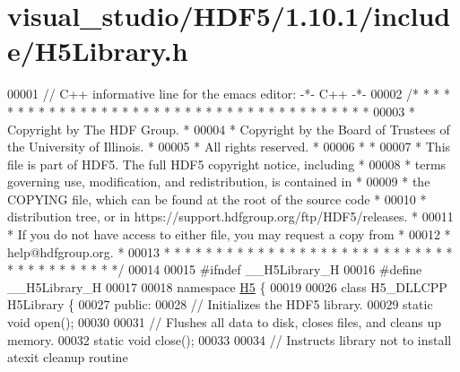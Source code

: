 \hypertarget{visual__studio_2_h_d_f5_21_810_81_2include_2_h5_library_8h_source}{}\section{visual\+\_\+studio/\+H\+D\+F5/1.10.1/include/\+H5\+Library.h}
\label{visual__studio_2_h_d_f5_21_810_81_2include_2_h5_library_8h_source}

\begin{DoxyCode}
00001 \textcolor{comment}{// C++ informative line for the emacs editor: -*- C++ -*-}
00002 \textcolor{comment}{/* * * * * * * * * * * * * * * * * * * * * * * * * * * * * * * * * * * * * * *}
00003 \textcolor{comment}{ * Copyright by The HDF Group.                                               *}
00004 \textcolor{comment}{ * Copyright by the Board of Trustees of the University of Illinois.         *}
00005 \textcolor{comment}{ * All rights reserved.                                                      *}
00006 \textcolor{comment}{ *                                                                           *}
00007 \textcolor{comment}{ * This file is part of HDF5.  The full HDF5 copyright notice, including     *}
00008 \textcolor{comment}{ * terms governing use, modification, and redistribution, is contained in    *}
00009 \textcolor{comment}{ * the COPYING file, which can be found at the root of the source code       *}
00010 \textcolor{comment}{ * distribution tree, or in https://support.hdfgroup.org/ftp/HDF5/releases.  *}
00011 \textcolor{comment}{ * If you do not have access to either file, you may request a copy from     *}
00012 \textcolor{comment}{ * help@hdfgroup.org.                                                        *}
00013 \textcolor{comment}{ * * * * * * * * * * * * * * * * * * * * * * * * * * * * * * * * * * * * * * */}
00014 
00015 \textcolor{preprocessor}{#ifndef \_\_H5Library\_H}
00016 \textcolor{preprocessor}{#define \_\_H5Library\_H}
00017 
00018 \textcolor{keyword}{namespace }\hyperlink{namespace_h5}{H5} \{
00019 
00026 \textcolor{keyword}{class }H5\_DLLCPP H5Library \{
00027    \textcolor{keyword}{public}:
00028         \textcolor{comment}{// Initializes the HDF5 library.}
00029         \textcolor{keyword}{static} \textcolor{keywordtype}{void} open();
00030 
00031         \textcolor{comment}{// Flushes all data to disk, closes files, and cleans up memory.}
00032         \textcolor{keyword}{static} \textcolor{keywordtype}{void} close();
00033 
00034         \textcolor{comment}{// Instructs library not to install atexit cleanup routine}

\end{DoxyCode}
